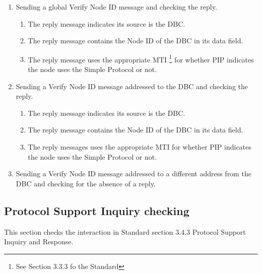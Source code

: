 \begin{enumerate}
\item Sending a global Verify Node ID message and checking the reply.
    \begin{enumerate}
    \item The reply message indicates its source is the DBC.
    \item The reply message contains the Node ID of the DBC in its data field.
    \item The reply message uses the appropriate MTI
            \footnote{See Section 3.3.3 fo the Standard}
            for whether PIP indicates the node 
            uses the Simple Protocol or not.
    \end{enumerate}

\item Sending a Verify Node ID message addressed to the DBC and checking the reply.
    \begin{enumerate}
    \item The reply message indicates its source is the DBC.
    \item The reply message contains the Node ID of the DBC in its data field.
    \item The reply messages uses the appropriate MTI for whether PIP indicates the node 
            uses the Simple Protocol or not.
    \end{enumerate}

\item Sending a Verify Node ID message addressed to a different address from the DBC
        and checking for the absence of a reply.
\end{enumerate}

\subsection{Protocol Support Inquiry checking}

This section checks the interaction in Standard section 3.4.3 Protocol Support Inquiry and Response.

